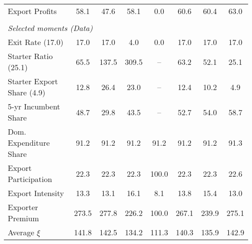 \documentclass[12pt,leqno]{article}
\begin{document}
\begin{table}[tbp]
\begin{tabular}{cccccccc}
\multicolumn{1}{l}{Export Profits} & 58.1 & 47.6 & 58.1 & 0.0 & 60.6 & 60.4 & 63.0 \\ 
&&&&&&&\\
\multicolumn{8}{l}{\textit{Selected moments (Data)}}\\
\multicolumn{1}{l}{Exit Rate (17.0)} & 17.0 & 17.0 & 4.0 & 0.0 & 17.0 & 17.0 & 17.0 \\ 
\multicolumn{1}{l}{Starter Ratio (25.1)} & 65.5 & 137.5 & 309.5 & -- & 63.2 & 52.1 & 25.1 \\ 
\multicolumn{1}{l}{Starter Export Share (4.9)} & 12.8 & 26.4 & 23.0 & -- & 12.4 & 10.2 & 4.9 \\ 
\multicolumn{1}{l}{5-yr Incumbent Share} & 48.7 & 29.8 & 43.5 & -- & 52.7 & 54.0 & 58.7 \\ 
\multicolumn{1}{l}{Dom. Expenditure Share} & 91.2 & 91.2 & 91.2 & 91.2 & 91.2 & 91.2 & 91.3 \\ 
\multicolumn{1}{l}{Export Participation} & 22.3 & 22.3 & 22.3 & 100.0 & 22.3 & 22.3 & 22.6 \\ 
\multicolumn{1}{l}{Export Intensity} & 13.3 & 13.1 & 16.1 & 8.1 & 13.8 & 15.4 & 13.0 \\ 
\multicolumn{1}{l}{Exporter Premium} & 273.5 & 277.8 & 226.2 & 100.0 & 267.1 & 239.9 & 275.1 \\ 
\multicolumn{1}{l}{Average $\xi$} & 141.8 & 142.5 & 134.2 & 111.3 & 140.3 & 135.9 & 142.9 \\ 
\bottomrule
\end{tabular}
\end{table}
\end{document}
